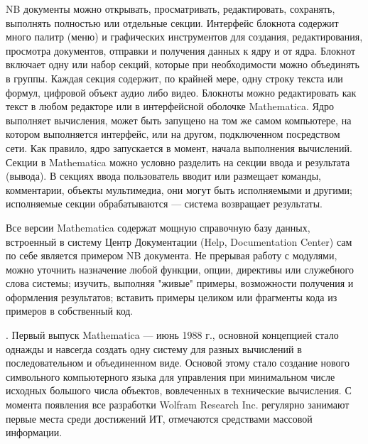 NB документы можно открывать, просматривать, редактировать, сохранять, выполнять полностью или отдельные секции. Интерфейс блокнота содержит много палитр (меню) и графических инструментов для создания, редактирования, просмотра документов, отправки и получения данных к ядру и от ядра. Блокнот включает одну или набор секций, которые при необходимости можно объединять в группы. Каждая секция содержит, по крайней мере, одну строку текста или формул, цифровой объект аудио либо видео. Блокноты можно редактировать как текст в любом редакторе или в интерфейсной оболочке Mathematica. Ядро выполняет вычисления, может быть запущено на том же самом компьютере, на котором выполняется интерфейс, или на другом, подключенном посредством сети. Как правило, ядро запускается в момент, начала выполнения вычислений.
Секции в Mathematica можно условно разделить на секции ввода и результата (вывода). В секциях ввода пользователь вводит или размещает команды, комментарии, объекты мультимедиа, они могут быть исполняемыми и другими; исполняемые секции обрабатываются --- система возвращает результаты.

Все версии Mathematica содержат мощную справочную базу данных, встроенный в систему Центр Документации (Help, Documentation Center) сам по себе является примером NB документа. Не прерывая работу с модулями, можно уточнить назначение любой функции, опции, директивы или служебного слова системы; изучить, выполняя "живые"{} примеры, возможности получения и оформления результатов; вставить примеры целиком или фрагменты кода из примеров в собственный код.

.
Первый выпуск Mathematica --- июнь 1988 г., основной концепцией стало однажды и навсегда создать одну систему для разных вычислений в последовательном и объединенном виде. Основой этому стало создание нового символьного компьютерного языка для управления при минимальном числе исходных большого числа объектов, вовлеченных в технические вычисления. С момента появления все разработки Wolfram Research Inc. регулярно занимают первые места среди достижений ИТ, отмечаются средствами массовой информации. 

